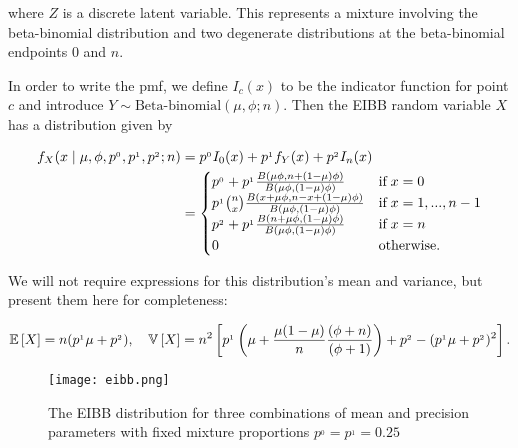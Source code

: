 where $Z$ is a discrete latent variable. This represents a mixture involving the beta-binomial distribution and two degenerate distributions at the beta-binomial endpoints $0$ and $n$.

In order to write the pmf, we define $I_c(x)$ to be the indicator function for point $c$ and introduce $Y \sim \text{Beta-binomial}(\mu, \phi; n)$. Then the EIBB random variable $X$ has a distribution given by

\begin{equation}
\begin{split}
f_{X}(x \mid \mu, \phi, p^{_0}, p^{_1}, p^{_2}; n)
&= p^{_0}I_0(x) + p^{_1} f_{Y}(x) + p^{_2}I_n(x)\\
&=	\begin{cases}
p^{_0} + p^{_1} {B(\mu\phi, n+(1-\mu)\phi) \over B(\mu\phi,(1-\mu)\phi)} & \text{if}\; x=0\\
p^{_1} {n \choose x} {B(x+\mu\phi, n-x+(1-\mu)\phi) \over B(\mu\phi,(1-\mu)\phi)} & \text{if}\; x=1,...,n-1\\
p^{_2} + p^{_1} {B(n+\mu\phi, (1-\mu)\phi) \over B(\mu\phi,(1-\mu)\phi)} & \text{if}\; x=n\\
0 & \text{otherwise.}
	\end{cases}
\end{split}
\label{densidad}
\end{equation}

We will not require expressions for this distribution's mean and variance, but present them here for completeness:

\begin{equation}
\begin{split}
{\mathbb E}\left[ X \right] = n(p^{_1}\mu + p^{_2}), \quad {\mathbb V}\left[ X \right] = n^2\left[ p^{_1}\left( \mu + \frac{ \mu(1-\mu)}{n}\frac{(\phi + n)}{(\phi+1)} \right) + p^{_2} - (p^{_1}\mu + p^{_2})^2\right].
\end{split}
\end{equation}

\begin{figure}
  \texttt{[image: eibb.png]}
  \caption{The EIBB distribution for three combinations of mean and precision parameters with fixed mixture proportions $p^{_0} = p^{_1} = 0.25$}
  \label{fig:eibb}
\end{figure}